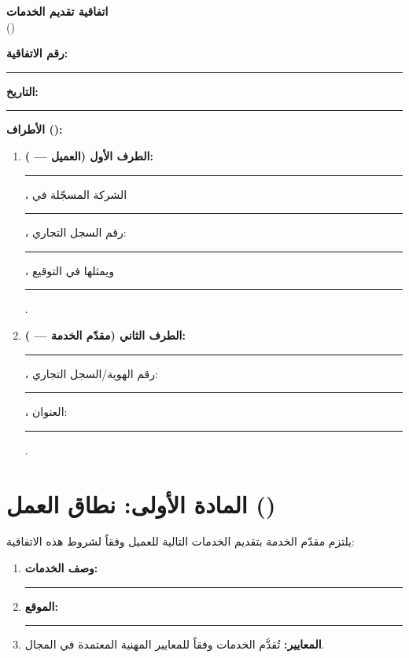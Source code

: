 \documentclass[12pt,a4paper]{article}
\begin{document}
\begin{center}
{\LARGE\bfseries اتفاقية تقديم الخدمات}\\[0.5em]
{\large ()}\\[1em]
\end{center}

\vspace{0.5em}

\noindent\textbf{رقم الاتفاقية:} \rule{4cm}{0.4pt} \hfill \textbf{التاريخ:} \rule{4cm}{0.4pt}

\vspace{1em}

\noindent\textbf{الأطراف ():}

\begin{enumerate}
    \item \textbf{الطرف الأول (العميل — ):} \rule{6cm}{0.4pt}، الشركة المسجّلة في \rule{4cm}{0.4pt}، رقم السجل التجاري: \rule{3cm}{0.4pt}، ويمثلها في التوقيع \rule{5cm}{0.4pt}.

    \item \textbf{الطرف الثاني (مقدّم الخدمة — ):} \rule{6cm}{0.4pt}، رقم الهوية/السجل التجاري: \rule{3cm}{0.4pt}، العنوان: \rule{5cm}{0.4pt}.
\end{enumerate}

\vspace{1em}

\section{المادة الأولى: نطاق العمل ()}
\label{sec:scope}
يلتزم مقدّم الخدمة بتقديم الخدمات التالية للعميل وفقاً لشروط هذه الاتفاقية:
\begin{enumerate}
    \item \textbf{وصف الخدمات:} \rule{8cm}{0.4pt}
    \item \textbf{الموقع:} \rule{6cm}{0.4pt}
    \item \textbf{المعايير:} تُقدَّم الخدمات وفقاً للمعايير المهنية المعتمدة في المجال.
\end{enumerate}

\end{document}
